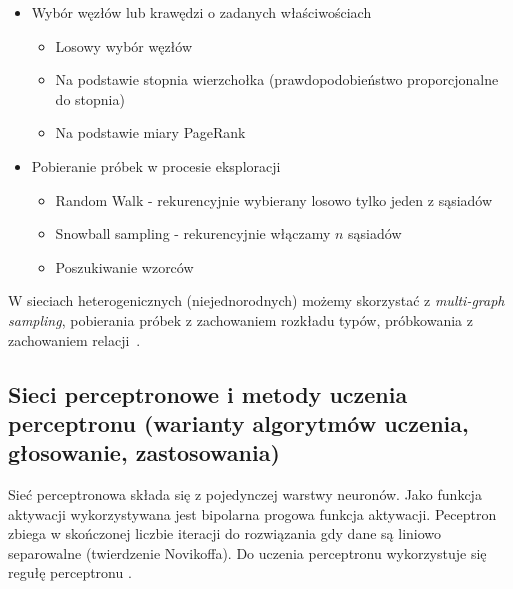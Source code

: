 \documentclass[wi]{zut}
\begin{document}
\begin{itemize}
    \item Wybór węzłów lub krawędzi o zadanych właściwościach
    \begin{itemize}
        \item Losowy wybór węzłów
        \item Na podstawie stopnia wierzchołka (prawdopodobieństwo proporcjonalne do stopnia)
        \item Na podstawie miary PageRank
    \end{itemize}
    \item Pobieranie próbek w procesie eksploracji
    \begin{itemize}
        \item Random Walk - rekurencyjnie wybierany losowo tylko jeden z sąsiadów
        \item Snowball sampling - rekurencyjnie włączamy $n$ sąsiadów
        \item Poszukiwanie wzorców
    \end{itemize}
\end{itemize}

W sieciach heterogenicznych (niejednorodnych) możemy skorzystać z \emph{multi-graph sampling}, pobierania próbek z zachowaniem rozkładu typów, próbkowania z zachowaniem relacji~\cite{Jankowski2020_probkowanie}.




\subsection{Sieci perceptronowe i metody uczenia perceptronu (warianty algorytmów uczenia, głosowanie, zastosowania)}

Sieć perceptronowa składa się z pojedynczej warstwy neuronów. Jako funkcja aktywacji wykorzystywana jest bipolarna progowa funkcja aktywacji. Peceptron zbiega w skończonej liczbie iteracji do rozwiązania gdy dane są liniowo separowalne (twierdzenie Novikoffa). Do uczenia perceptronu wykorzystuje się regułę perceptronu \cite{Korzen2020_8}.
\end{document}
